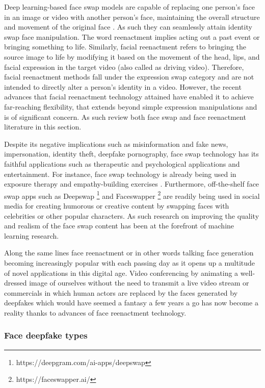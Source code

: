 Deep learning-based face swap models are capable of replacing one person's face in an image or video with another person's face, maintaining the overall structure and movement of the original face \cite{mirsky2021creation}. As such they can seamlessly attain identity swap face manipulation. The word reenactment implies acting out a past event or bringing something to life. Similarly, facial reenactment refers to bringing the source image to life by modifying it based on the movement of the head, lips, and facial expression in the target video (also called as driving video). Therefore, facial reenactment methods fall under the expression swap category and are not intended to directly alter a person's identity in a video. However, the recent advances that facial reenactment technology attained have enabled it to achieve far-reaching flexibility, that extends beyond simple expression manipulations and is of significant concern. As such review both face swap and face reenactment literature in this section.

Despite its negative implications such as misinformation and fake news, impersonation, identity theft, deepfake pornography, face swap technology has its faithful applications such as therapeutic and psychological applications and entertainment. For instance, face swap technology is already being used in exposure therapy and empathy-building exercises \cite{yang2022can}. Furthermore, off-the-shelf face swap apps such as Deepswap \footnote{https://deepgram.com/ai-apps/deepswap} and Faceswapper \footnote{https://faceswapper.ai/} are readily being used in social media for creating humorous or creative content by swapping faces with celebrities or other popular characters. As such research on improving the quality and realism of the face swap content has been at the forefront of machine learning research.

Along the same lines face reenactment or in other words talking face generation becoming increasingly popular with each passing day as it opens up a multitude of novel applications in this digital age. Video conferencing by animating a well-dressed image of ourselves without the need to transmit a live video stream \cite{deepfakevideocall} or commercials in which human actors are replaced by the faces generated by deepfakes \cite{lomnitz2020multimodal} which would have seemed a fantasy a few years a go has now become a reality thanks to advances of face reenactment technology.

\subsubsection{Face deepfake types}

